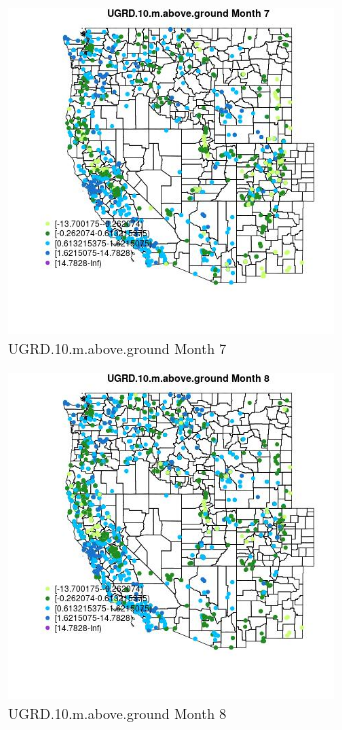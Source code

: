 \begin{figure} 
\centering  
\includegraphics[width=0.77\textwidth]{Code_Outputs/Report_ML_input_PM25_Step4_part_f_de_duplicated_aveswNAs_MapObsMo7UGRD10maboveground.jpg} 
\caption{\label{fig:Report_ML_input_PM25_Step4_part_f_de_duplicated_aveswNAsMapObsMo7UGRD10maboveground}UGRD.10.m.above.ground Month 7} 
\end{figure} 
 

\begin{figure} 
\centering  
\includegraphics[width=0.77\textwidth]{Code_Outputs/Report_ML_input_PM25_Step4_part_f_de_duplicated_aveswNAs_MapObsMo8UGRD10maboveground.jpg} 
\caption{\label{fig:Report_ML_input_PM25_Step4_part_f_de_duplicated_aveswNAsMapObsMo8UGRD10maboveground}UGRD.10.m.above.ground Month 8} 
\end{figure} 
 

